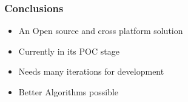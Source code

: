 \documentclass{beamer}
\begin{document}
\begin{frame}
\frametitle{Conclusions}
    \begin{itemize}[<only@+-+(4)>]
	\item An Open source  and cross platform solution
	\item Currently in its POC stage
	\item Needs many iterations for development
	\item Better Algorithms possible 
	
	

    \end{itemize}
        
\end{frame}
\end{document}
